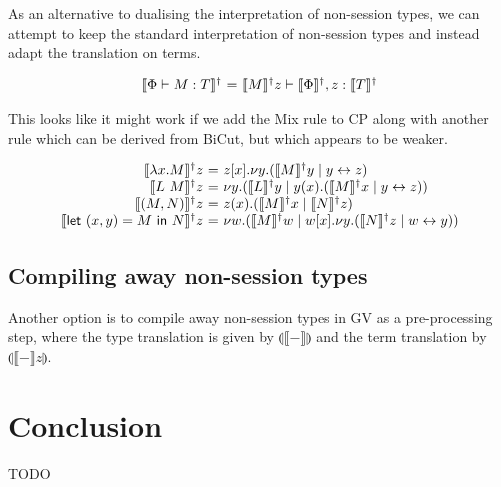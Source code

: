 \documentclass{easychair}
\makeatletter
\newcommand{\ba}{\begin{array}}
\newcommand{\ea}{\end{array}}
\newenvironment{equations}{\[\ba{@{}r@{~}c@{~}l@{}}}{\ea\]}
\newcommand{\key}{\mathsf}
\newcommand{\gvtocp}[1]{\llbracket{#1}\rrbracket}
\newcommand{\cptogv}[1]{\llparenthesis{#1}\rrparenthesis}
\newcommand{\cpj}[2]{{#1} \vdash {#2}}
\newcommand{\gvj}[3]{{#1} \vdash {#2} : {#3}}
\newcommand{\T}{T}
\newcommand{\gvPair}[2]{({#1},{#2})}
\newcommand{\gvLet}[3]{\key{let}~{#1}={#2}~\key{in}~{#3}}
\newcommand{\cpLink}[2]{{#1} \leftrightarrow {#2}}
\newcommand{\cpCut}[3]{\nu {#1}.({#2} \mid {#3})}
\newcommand{\cpInput}[3]{{#1}({#2}).{#3}}
\makeatother
\begin{document}
As an alternative to dualising the interpretation of non-session
types, we can attempt to keep the standard interpretation of
non-session types and instead adapt the translation on terms.

\begin{equations}
\gvtocpd{\gvj{\Phi}{M}{\T}} &=& \cpj{\gvtocpd{M} z}{\gvtocpd{\Phi}, z:{\gvtocpd{\T}}}
\end{equations}

This looks like it might work if we add the Mix rule to CP along with
another rule which can be derived from BiCut, but which appears to
be weaker.





\newcommand{\cpMix}[2]{({#1} \mid {#2})}
\newcommand{\cpCutOutput}[5]{{#2}[{#3}].\nu{#1}.\cpMix{#4}{#5}}

\begin{equations}
\gvtocpd{\lambda x.M}z &=& \cpCutOutput{y}{z}{x}{\gvtocpd{M}y}{\cpLink{y}{z}} \\
\gvtocpd{L~M}z &=& \cpCut{y}{\gvtocpd{L}y}{\cpInput{y}{x}{\cpMix{\gvtocpd{M}x}{\cpLink{y}{z}}}} \\
\gvtocpd{\gvPair{M}{N}}z &=& \cpInput{z}{x}{\cpMix{\gvtocpd{M}x}{\gvtocpd{N}z}} \\
\gvtocpd{\gvLet{\gvPair{x}{y}}{M}{N}}z &=&
  \cpCut{w}{\gvtocpd{M}w}{\cpCutOutput{y}{w}{x}{\gvtocpd{N}z}{\cpLink{w}{y}}} \\
\end{equations}

\subsection{Compiling away non-session types}

Another option is to compile away non-session types in GV as a
pre-processing step, where the type translation is given by
$\cptogv{\gvtocp{-}}$ and the term translation by
$\cptogv{\gvtocp{-}z}$.

\newpage
\section{Conclusion}

TODO

\cite{wadler2014jfp}

\label{sect:bib}

%
%
%




\end{document}
